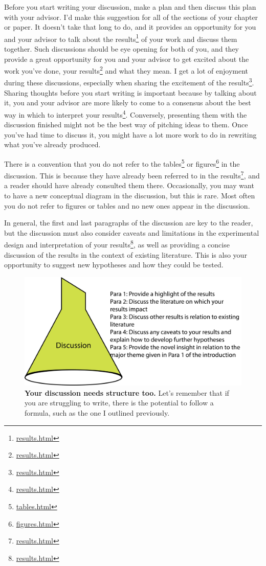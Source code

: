 \documentclass[
]{krantz}
\renewcommand{\href}[2]{#2\footnote{\url{#1}}}
\begin{document}
Before you start writing your discussion, make a plan and then discuss this plan with your advisor. I'd make this suggestion for all of the sections of your chapter or paper. It doesn't take that long to do, and it provides an opportunity for you and your advisor to talk about the \href{results.html}{results} of your work and discuss them together. Such discussions should be eye opening for both of you, and they provide a great opportunity for you and your advisor to get excited about the work you've done, your \href{results.html}{results} and what they mean. I get a lot of enjoyment during these discussions, especially when sharing the excitement of the \href{results.html}{results}. Sharing thoughts before you start writing is important because by talking about it, you and your advisor are more likely to come to a consensus about the best way in which to interpret your \href{results.html}{results}. Conversely, presenting them with the discussion finished might not be the best way of pitching ideas to them. Once you've had time to discuss it, you might have a lot more work to do in rewriting what you've already produced.

There is a convention that you do not refer to the \href{tables.html}{tables} or \href{figures.html}{figures} in the discussion. This is because they have already been referred to in the \href{results.html}{results}, and a reader should have already consulted them there. Occasionally, you may want to have a new conceptual diagram in the discussion, but this is rare. Most often you do not refer to figures or tables and no new ones appear in the discussion.

In general, the first and last paragraphs of the discussion are key to the reader, but the discussion must also consider caveats and limitations in the experimental design and interpretation of your \href{results.html}{results}, as well as providing a concise discussion of the results in the context of existing literature. This is also your opportunity to suggest new hypotheses and how they could be tested.



\begin{figure}
\includegraphics[width=0.95\linewidth]{figures/discussion} \caption{\textbf{Your discussion needs structure too.} Let's remember that if you are struggling to write, there is the potential to follow a formula, such as the one I outlined previously.}\label{fig:discussion}
\end{figure}
\end{document}
